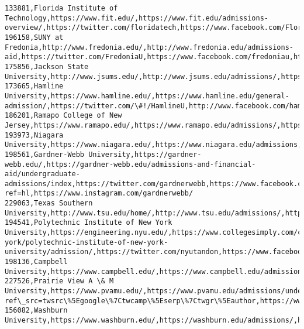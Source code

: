 \documentclass[11pt]{article}
\begin{document}
\begin{Verbatim}[commandchars=\\\{\}]
133881,Florida Institute of Technology,https://www.fit.edu/,https://www.fit.edu/admissions-overview/,https://twitter.com/floridatech,https://www.facebook.com/FloridaInstituteofTechnology,https://www.instagram.com/floridatech/
196158,SUNY at Fredonia,http://www.fredonia.edu/,http://www.fredonia.edu/admissions-aid,https://twitter.com/FredoniaU,https://www.facebook.com/fredoniau,https://www.instagram.com/fredoniau/p/BpUccgplrfj/
175856,Jackson State University,http://www.jsums.edu/,http://www.jsums.edu/admissions/,https://twitter.com/jacksonstateU,https://www.facebook.com/JacksonState,http://instagram.com/jacksonstateu/
173665,Hamline University,https://www.hamline.edu/,https://www.hamline.edu/general-admission/,https://twitter.com/\#!/HamlineU,http://www.facebook.com/hamline,http://instagram.com/hamlineu
186201,Ramapo College of New Jersey,https://www.ramapo.edu/,https://www.ramapo.edu/admissions/,https://twitter.com/ramapocollegenj,https://www.facebook.com/RamapoCollege,//instagram.com/ramapocollegenj\#
193973,Niagara University,https://www.niagara.edu/,https://www.niagara.edu/admissions,https://twitter.com/niagarauniv,https://www.facebook.com/niagarau,http://instagram.com/niagarauniversity
198561,Gardner-Webb University,https://gardner-webb.edu/,https://gardner-webb.edu/admissions-and-financial-aid/undergraduate-admissions/index,https://twitter.com/gardnerwebb,https://www.facebook.com/gardnerwebb?ref=hl,https://www.instagram.com/gardnerwebb/
229063,Texas Southern University,http://www.tsu.edu/home/,http://www.tsu.edu/admissions/,http://twitter.com/TexasSouthern,https://www.facebook.com/texassouthernuniversity,https://www.instagram.com/texassouthern/
194541,Polytechnic Institute of New York University,https://engineering.nyu.edu/,https://www.collegesimply.com/colleges/new-york/polytechnic-institute-of-new-york-university/admission/,https://twitter.com/nyutandon,https://www.facebook.com/nyutandon,https://www.instagram.com/nyutandon
198136,Campbell University,https://www.campbell.edu/,https://www.campbell.edu/admissions/,https://twitter.com/campbelledu,https://www.facebook.com/campbelluniversity/,https://www.instagram.com/campbelledu/
227526,Prairie View A \& M University,https://www.pvamu.edu/,https://www.pvamu.edu/admissions/undergraduate/,https://twitter.com/PVAMU?ref\_src=twsrc\%5Egoogle\%7Ctwcamp\%5Eserp\%7Ctwgr\%5Eauthor,https://www.facebook.com/pvamu/,https://www.instagram.com/pvamu/
156082,Washburn University,https://www.washburn.edu/,https://washburn.edu/admissions/,https://twitter.com/washburnuniv,https://facebook.com/washburnuniversity,https://www.instagram.com/washburnuniversity/

\end{Verbatim}
\end{document}
